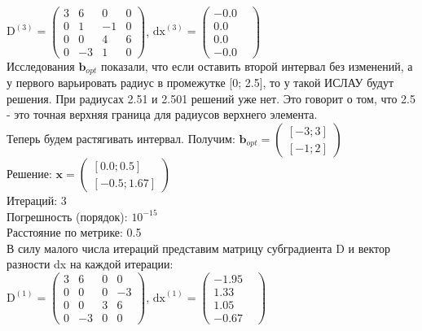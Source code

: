 \documentclass[../body.tex]{subfiles}
\begin{document}
\\$\textrm{D}^{(3)} = \begin{pmatrix}
        3& 6& 0& 0\\
        0& 1& -1& 0\\
        0& 0& 4& 6\\
        0& -3& 1& 0
        \end{pmatrix}$, $\textrm{dx}^{(3)} = \begin{pmatrix}
        -0.0&\\
        0.0&\\
        0.0&\\
        -0.0&
        \end{pmatrix}$
\\Исследования $\textbf{b}_{opt}$ показали, что если оставить второй интервал без изменений, а у первого варьировать радиус в промежутке [0; 2.5], то у такой ИСЛАУ будут решения. При радиусах 2.51 и 2.501 решений уже нет. Это говорит о том, что 2.5 - это точная верхняя граница для радиусов верхнего элемента.
\\Теперь будем растягивать интервал. Получим: $\textbf{b}_{opt} =         \begin{pmatrix}
        [-3;3]\\
        [-1;2]
        \end{pmatrix}$
\\Решение: $\textbf{x} = \begin{pmatrix}
        [0.0;0.5]\\
        [-0.5;1.67]
        \end{pmatrix}$
\\Итераций: 3
\\Погрешность (порядок): $10^{-15}$
\\Расстояние по метрике: 0.5
\\В силу малого числа итераций представим матрицу субградиента D и вектор разности dx на каждой итерации:
\\$\textrm{D}^{(1)} = \begin{pmatrix}
        3& 6& 0& 0\\
        0& 0& 0& -3\\
        0& 0& 3& 6\\
        0& -3& 0& 0
        \end{pmatrix}$, $\textrm{dx}^{(1)} = \begin{pmatrix}
        -1.95&\\
        1.33&\\
        1.05&\\
        -0.67&
        \end{pmatrix}$
\end{document}
